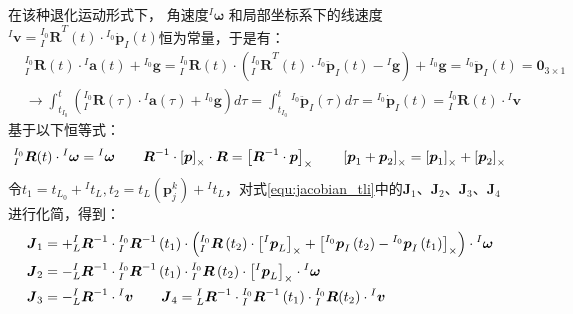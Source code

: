 在该种退化运动形式下，
角速度${^{I}\boldsymbol{\omega}}$
和局部坐标系下的线速度${^{I}\boldsymbol{v}}={^{I_0}_{I}\boldsymbol{R}}^{T}(t)\cdot{^{I_0}\dot{\boldsymbol{p}}_{I}(t)}$恒为常量，于是有：
\begin{equation}
  \begin{aligned}
     & {^{I_0}_{I}\boldsymbol{R}}(t)\cdot{^{I}\boldsymbol{a}}(t)+{^{I_0}\boldsymbol{g}}=
    {^{I_0}_{I}\boldsymbol{R}}(t)\cdot
    \left(
    {^{I_0}_{I}\boldsymbol{R}}^{T}(t)\cdot{^{I_0}\ddot{\boldsymbol{p}}_{I}(t)}-{^{I}\boldsymbol{g}}
    \right)
    +{^{I_0}\boldsymbol{g}}={^{I_0}\ddot{\boldsymbol{p}}_{I}(t)}=\boldsymbol{0}_{3\times 1} \\
     & \to
    \int_{t_{I_0}}^{t}\left(
    {^{I_0}_{I}\boldsymbol{R}}(\tau)\cdot{^{I}\boldsymbol{a}}(\tau)+{^{I_0}\boldsymbol{g}}
    \right)d\tau
    =\int_{t_{I_0}}^{t} {^{I_0}\ddot{\boldsymbol{p}}_{I}(\tau)} d\tau
    ={^{I_0}\dot{\boldsymbol{p}}_{I}(t)}
    ={^{I_0}_{I}\boldsymbol{R}}(t)\cdot{^{I}\boldsymbol{v}}
  \end{aligned}
\end{equation}
基于以下恒等式：
\begin{equation*}
  {{^{I_0}_{I}}\boldsymbol{R}}(t)\cdot{^{I}\boldsymbol{\omega}}={^{I}\boldsymbol{\omega}}
  \quad\quad
  \boldsymbol{R}^{-1}\cdot\left[ \boldsymbol{p} \right]_\times\cdot\boldsymbol{R}=\left[ \boldsymbol{R}^{-1}\cdot\boldsymbol{p} \right]_\times
  \quad\quad
  \left[ \boldsymbol{p}_1+\boldsymbol{p}_2 \right]_\times=\left[ \boldsymbol{p}_1 \right]_\times+\left[ \boldsymbol{p}_2 \right]_\times
\end{equation*}
令$t_1=t_{L_0}+{^{I}t_L},t_2=t_{L}(\boldsymbol{p}_j^k)+{^{I}t_L}$，对式\ref{equ:jacobian_tli}中的$\boldsymbol{J}_1$、$\boldsymbol{J}_2$、$\boldsymbol{J}_3$、$\boldsymbol{J}_4$进行化简，得到：
\begin{equation}
  \begin{aligned}
     & \boldsymbol{J}_1=+{{^{I}_{L}}\boldsymbol{R}^{-1}}\cdot{{^{I_0}_{I}}\boldsymbol{R}^{-1}
      \left( t_1\right) }\cdot
    \left(
    {{^{I_0}_{I}}\boldsymbol{R}\left( t_2\right) }\cdot\left[ {^{I}\boldsymbol{p}_L} \right]_\times
    +\left[ {^{I_0}\boldsymbol{p}_I\left( t_2\right)}-{^{I_0}\boldsymbol{p}_I\left( t_1\right)} \right]_\times
    \right)
    \cdot{^{I}\boldsymbol{\omega}}
    \\
     & \boldsymbol{J}_2=-{{^{I}_{L}}\boldsymbol{R}^{-1}}\cdot{{^{I_0}_{I}}\boldsymbol{R}^{-1}
      \left( t_1\right) }\cdot{{^{I_0}_{I}}\boldsymbol{R}\left( t_2\right) }
    \cdot\left[ {^{I}\boldsymbol{p}_L} \right]_\times
    \cdot{^{I}\boldsymbol{\omega}}
    \\
     & \boldsymbol{J}_3=-{{^{I}_{L}}\boldsymbol{R}^{-1}}\cdot{^{I}\boldsymbol{v}}
    \quad\quad
    \boldsymbol{J}_4=
    {{^{I}_{L}}\boldsymbol{R}^{-1}}\cdot{{^{I_0}_{I}}\boldsymbol{R}^{-1}\left( t_1\right) }
    \cdot
    {^{I_0}_{I}\boldsymbol{R}}(t_2)\cdot{^{I}\boldsymbol{v}}
  \end{aligned}
\end{equation}
